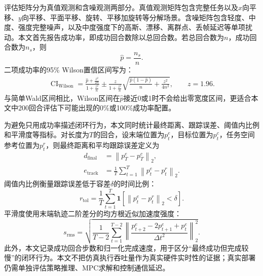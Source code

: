 评估矩阵分为真值观测和含噪观测两部分。真值观测矩阵包含完整任务以及$x$向平移、$y$向平移、平面平移、旋转、平移加旋转等分解场景。含噪矩阵包含轻度、中度、强度完整噪声，以及中度强度下的高斯、漂移、离群点、丢帧延迟等单项扰动。本文首先报告成功率，即成功回合数除以总回合数。若总回合数为$n$，成功回合数为$n_s$，则
\begin{equation}
    \hat{p}=\frac{n_s}{n}.
    \label{eq:success-rate}
\end{equation}
二项成功率的95\% Wilson置信区间写为\citep{wilson1927probable,brown2001interval}：
\begin{align}
    \operatorname{CI}_{\mathrm{Wilson}}
    =\frac{\hat{p}+\frac{z^2}{2n}}{1+\frac{z^2}{n}}
    \pm
    \frac{z}{1+\frac{z^2}{n}}
    \sqrt{\frac{\hat{p}(1-\hat{p})}{n}+\frac{z^2}{4n^2}},\qquad z=1.96.
    \label{eq:wilson-ci}
\end{align}
与简单Wald区间相比，Wilson区间在$\hat{p}$接近0或1时不会给出零宽度区间，更适合本文中200回合评估下可能出现的0\%或100\%成功率配置\citep{brown2001interval}。

为避免只用成功率描述闭环行为，本文同时统计最终距离、跟踪误差、阈值内比例和平滑度等指标。对长度为$T$的回合，设末端位置为$p^e_t$，目标位置为$p^c_t$，任务空间参考位置为$p^r_t$，则最终距离和平均跟踪误差定义为
\begin{align}
    d_{\mathrm{final}} &= \left\|p^e_T-p^c_T\right\|_2, \\
    e_{\mathrm{track}} &= \frac{1}{T}\sum_{t=1}^{T}\left\|p^e_t-p^r_t\right\|_2.
    \label{eq:distance-tracking-metrics}
\end{align}
阈值内比例衡量跟踪误差低于容差$\delta$的时间比例：
\begin{equation}
    r_{\mathrm{tol}}=\frac{1}{T}\sum_{t=1}^{T}\mathbf{1}\left[\left\|p^e_t-p^r_t\right\|_2<\delta\right].
    \label{eq:within-tolerance}
\end{equation}
平滑度使用末端轨迹二阶差分的均方根近似加速度强度：
\begin{equation}
    s_{\mathrm{rms}}
    =\sqrt{\frac{1}{T-2}\sum_{t=1}^{T-2}
    \left\|\frac{p^e_{t+2}-2p^e_{t+1}+p^e_t}{\Delta t^2}\right\|_2^2}.
    \label{eq:smoothness-metric}
\end{equation}
此外，本文记录成功回合步数和归一化完成速度，用于区分“最终成功但完成较慢”的闭环行为。本文不把仿真执行吞吐量作为真实硬件实时性的证据；真实部署仍需单独评估策略推理、MPC求解和控制通信延迟。
